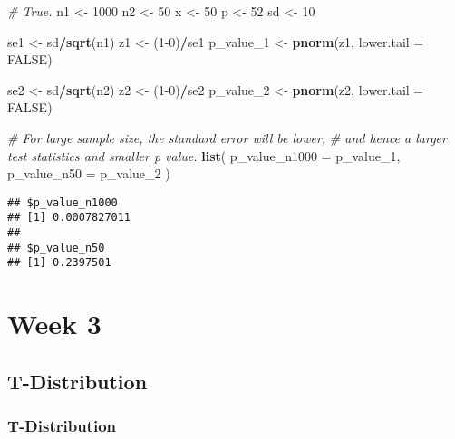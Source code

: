 \documentclass[]{book}
\newenvironment{Shaded}{\begin{snugshade}}{\end{snugshade}}
\newcommand{\CommentTok}[1]{\textcolor[rgb]{0.56,0.35,0.01}{\textit{#1}}}
\newcommand{\DataTypeTok}[1]{\textcolor[rgb]{0.13,0.29,0.53}{#1}}
\newcommand{\DecValTok}[1]{\textcolor[rgb]{0.00,0.00,0.81}{#1}}
\newcommand{\KeywordTok}[1]{\textcolor[rgb]{0.13,0.29,0.53}{\textbf{#1}}}
\newcommand{\NormalTok}[1]{#1}
\newcommand{\OperatorTok}[1]{\textcolor[rgb]{0.81,0.36,0.00}{\textbf{#1}}}
\newcommand{\OtherTok}[1]{\textcolor[rgb]{0.56,0.35,0.01}{#1}}
\newcommand{\StringTok}[1]{\textcolor[rgb]{0.31,0.60,0.02}{#1}}
\begin{document}
\begin{Shaded}
\begin{Highlighting}[]
\CommentTok{# True. }
\NormalTok{n1 <-}\StringTok{ }\DecValTok{1000}
\NormalTok{n2 <-}\StringTok{ }\DecValTok{50}
\NormalTok{x <-}\StringTok{ }\DecValTok{50}
\NormalTok{p <-}\StringTok{ }\DecValTok{52}
\NormalTok{sd <-}\StringTok{ }\DecValTok{10}

\NormalTok{se1 <-}\StringTok{ }\NormalTok{sd}\OperatorTok{/}\KeywordTok{sqrt}\NormalTok{(n1)}
\NormalTok{z1 <-}\StringTok{ }\NormalTok{(}\DecValTok{1-0}\NormalTok{)}\OperatorTok{/}\NormalTok{se1}
\NormalTok{p_value_}\DecValTok{1}\NormalTok{ <-}\StringTok{ }\KeywordTok{pnorm}\NormalTok{(z1, }\DataTypeTok{lower.tail =} \OtherTok{FALSE}\NormalTok{)}

\NormalTok{se2 <-}\StringTok{ }\NormalTok{sd}\OperatorTok{/}\KeywordTok{sqrt}\NormalTok{(n2)}
\NormalTok{z2 <-}\StringTok{ }\NormalTok{(}\DecValTok{1-0}\NormalTok{)}\OperatorTok{/}\NormalTok{se2}
\NormalTok{p_value_}\DecValTok{2}\NormalTok{ <-}\StringTok{ }\KeywordTok{pnorm}\NormalTok{(z2, }\DataTypeTok{lower.tail =} \OtherTok{FALSE}\NormalTok{)}

\CommentTok{# For large sample size, the standard error will be lower,}
\CommentTok{# and hence a larger test statistics and smaller p value.}
\KeywordTok{list}\NormalTok{(}
  \DataTypeTok{p_value_n1000 =}\NormalTok{ p_value_}\DecValTok{1}\NormalTok{,}
  \DataTypeTok{p_value_n50 =}\NormalTok{ p_value_}\DecValTok{2}
\NormalTok{)}
\end{Highlighting}
\end{Shaded}

\begin{verbatim}
## $p_value_n1000
## [1] 0.0007827011
## 
## $p_value_n50
## [1] 0.2397501
\end{verbatim}

\hypertarget{week-3}{%
\chapter*{Week 3}\label{week-3}}

\hypertarget{t-distribution}{%
\section*{T-Distribution}\label{t-distribution}}

\hypertarget{t-distribution-1}{%
\subsection*{T-Distribution}\label{t-distribution-1}}
\end{document}
